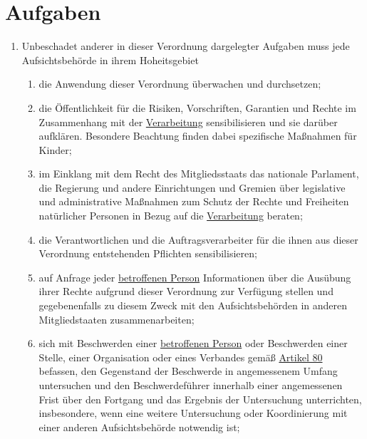 \chapter{Aufgaben}
\label{ch:57}


\begin{enumerate}

  \item Unbeschadet anderer in dieser Verordnung dargelegter Aufgaben muss jede Aufsichtsbehörde in ihrem Hoheitsgebiet
\label{itm:57-1}

  \begin{enumerate}
  
    \item die Anwendung dieser Verordnung überwachen und durchsetzen;
    \label{itm:57-1a}

    \item die Öffentlichkeit für die Risiken, Vorschriften, Garantien und Rechte im Zusammenhang mit der \hyperref[itm:04-2]{Verarbeitung}
     sensibilisieren und sie darüber aufklären. Besondere Beachtung finden dabei spezifische Maßnahmen für Kinder;
    \label{itm:57-1b}

    \item im Einklang mit dem Recht des Mitgliedsstaats das nationale Parlament, die Regierung und andere Einrichtungen
     und Gremien über legislative und administrative Maßnahmen zum Schutz der Rechte und Freiheiten natürlicher
     Personen in Bezug auf die \hyperref[itm:04-2]{Verarbeitung} beraten;
    \label{itm:57-1c}

    \item die Verantwortlichen und die Auftragsverarbeiter für die ihnen aus dieser Verordnung entstehenden Pflichten
     sensibilisieren;
    \label{itm:57-1d}

    \item auf Anfrage jeder \hyperref[itm:04-1]{betroffenen Person} Informationen über die Ausübung ihrer Rechte aufgrund dieser Verordnung
     zur Verfügung stellen und gegebenenfalls zu diesem Zweck mit den Aufsichtsbehörden in anderen Mitgliedstaaten
     zusammenarbeiten;
    \label{itm:57-1e}

    \item sich mit Beschwerden einer \hyperref[itm:04-1]{betroffenen Person} oder Beschwerden einer Stelle, einer Organisation oder eines
     Verbandes gemäß \hyperref[ch:80]{Artikel 80} befassen, den Gegenstand der Beschwerde in angemessenem Umfang
     untersuchen und den Beschwerdeführer innerhalb einer angemessenen Frist über den Fortgang und das Ergebnis der
     Untersuchung unterrichten, insbesondere, wenn eine weitere Untersuchung oder Koordinierung mit einer anderen
     Aufsichtsbehörde notwendig ist;
    \label{itm:57-1f}


\end{enumerate}
\end{enumerate}
